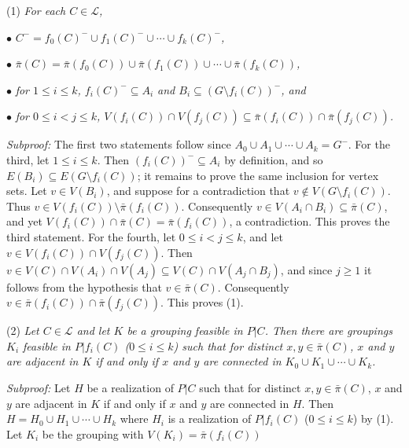 \hspace*{12pt}(1) \textit{For each $C \in \mathcal{L}$,}

\hspace*{12pt}$\bullet$ \textit{$C^- = f_0(C)^- \cup f_1(C)^- \cup \cdots \cup f_k(C)^-$,}

\hspace*{12pt}$\bullet$ \textit{$\bar{\pi}(C) = \bar{\pi}(f_0(C)) \cup \bar{\pi}(f_1(C)) \cup \cdots \cup \bar{\pi}(f_k(C))$,}

\hspace*{12pt}$\bullet$ \textit{for $1 \le i \le k$, $f_i(C)^- \subseteq A_i$ and $B_i \subseteq (G \setminus f_i(C))^-$, and}

\hspace*{12pt}$\bullet$ \textit{for $0 \le i < j \le k$, $V(f_i(C)) \cap V(f_j(C)) \subseteq \bar{\pi}(f_i(C)) \cap \bar{\pi}(f_j(C))$.}

\textit{Subproof:} The first two statements follow since $A_0 \cup A_1 \cup \cdots \cup A_k = G^-$. For the third, let $1 \le i \le k$. Then $(f_i(C))^- \subseteq A_i$ by definition, and so $E(B_i) \subseteq E(G \setminus f_i(C))$; it remains to prove the same inclusion for vertex sets. Let $v \in V(B_i)$, and suppose for a contradiction that $v \notin V(G \setminus f_i(C))$. Thus $v \in V(f_i(C)) \setminus \bar{\pi}(f_i(C))$. Consequently $v \in V(A_i \cap B_i) \subseteq \bar{\pi}(C)$, and yet $V(f_i(C)) \cap \bar{\pi}(C) = \bar{\pi}(f_i(C))$, a contradiction. This proves the third statement. For the fourth, let $0 \le i < j \le k$, and let $v \in V(f_i(C)) \cap V(f_j(C))$. Then $v \in V(C) \cap V(A_i) \cap V(A_j) \subseteq V(C) \cap V(A_j \cap B_j)$, and since $j \ge 1$ it follows from the hypothesis that $v \in \bar{\pi}(C)$. Consequently $v \in \bar{\pi}(f_i(C)) \cap \bar{\pi}(f_j(C))$. This proves (1).

\hspace*{12pt}(2) \textit{Let $C \in \mathcal{L}$ and let $K$ be a grouping feasible in $P | C$. Then there are groupings $K_i$ feasible in $P | f_i(C)$ ($0 \le i \le k$) such that for distinct $x, y \in \bar{\pi}(C)$, $x$ and $y$ are adjacent in $K$ if and only if $x$ and $y$ are connected in $K_0 \cup K_1 \cup \cdots \cup K_k$.}

\textit{Subproof:} Let $H$ be a realization of $P | C$ such that for distinct $x, y \in \bar{\pi}(C)$, $x$ and $y$ are adjacent in $K$ if and only if $x$ and $y$ are connected in $H$. Then $H = H_0 \cup H_1 \cup \cdots \cup H_k$ where $H_i$ is a realization of $P | f_i(C)$ ($0 \le i \le k$) by (1). Let $K_i$ be the grouping with $V(K_i) = \bar{\pi}(f_i(C))$
